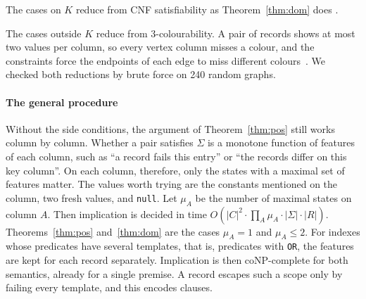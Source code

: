\documentclass[conference]{IEEEtran}
\theoremstyle{definition}
\newcommand{\sql}[1]{\texttt{#1}}
\newcommand{\nul}{\texttt{null}}
\newcommand{\Sig}{\Sigma}
\newcommand{\U}[1]{\mathrm{U}(#1)}
\newcommand{\tpl}[1]{\ensuremath{\langle #1\rangle}}
\newif\ifextended
\begin{document}
The cases on $K$ reduce from CNF satisfiability as Theorem~\ref{thm:dom} does \ifextended(Appendix~\ref{app:reason})\else\cite{EXT}\fi.
\ifextended
The cases outside $K$ reduce from 3-colourability: take \sql{NOT NULL} columns $A_u$, one per
vertex, and $B$, the goal $\{\tpl{}\}:\U{B}$, and for every edge $uv$ and colour $c$ the
constraint $\{\tpl{A_u{:}\,{\notin}\{c\},A_v{:}\,{\notin}\{c\}}\}:\U{B}$ (for ${\in}$: $\tau$ has
${\in}\{1,2,3\}$ on every $A_u$, and the constraint ${\in}\{1,2,3\}\setminus\{c\}$). A pair
violating the goal satisfies the constraint for $uv$ and $c$ iff $c$ is among its four values on
$A_u$ and $A_v$. Given a proper colouring, let both records carry on $A_u$ the two colours other
than that of $u$: every edge then shows all three. Conversely, two records show at most two
colours per vertex. Colour each vertex with one that its records miss. Then no edge is monochromatic,
because its endpoints together show every colour. So $\Sig\models\{\tau\}:\U{B}$ iff the graph is not
3-colourable. We checked both reductions by brute force on 240 random graphs.\else
The cases outside $K$ reduce from 3-colourability. A pair of records shows at most two values per column, so
every vertex column misses a colour, and the constraints force the endpoints of each edge to miss different
colours~\cite{EXT}. We checked both reductions by brute force
on 240 random graphs.\fi


\paragraph*{The general procedure} Without the side conditions, the argument of Theorem~\ref{thm:pos} still works
column by column. Whether a pair satisfies $\Sig$ is a monotone function of features of each column, such as ``a record
fails this entry'' or ``the records differ on this key column''. On each column, therefore, only the states with a maximal set
of features matter. The values worth trying are the constants mentioned on the column, two fresh values, and \nul. Let
$\mu_A$ be the number of maximal states on column $A$. Then implication is decided in time
$O(|C|^2\cdot\prod_A\mu_A\cdot|\Sig|\cdot|R|)$. Theorems~\ref{thm:pos} and~\ref{thm:dom} are the cases $\mu_A=1$ and
$\mu_A\le2$. For indexes whose predicates have several templates, that is, predicates with \sql{OR}, the features are kept for
each record separately. Implication is then coNP-complete for both semantics, already for a single premise. A record escapes such a
scope only by failing every template, and this encodes clauses.
\end{document}

